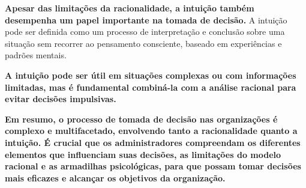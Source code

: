 \textbf{Apesar das limitações da racionalidade, a intuição também desempenha um papel importante na tomada de decisão.} A intuição pode ser definida como um processo de interpretação e conclusão sobre uma situação sem recorrer ao pensamento consciente, baseado em experiências e padrões mentais.

\textbf{A intuição pode ser útil em situações complexas ou com informações limitadas, mas é fundamental combiná-la com a análise racional para evitar decisões impulsivas.}

\textbf{Em resumo, o processo de tomada de decisão nas organizações é complexo e multifacetado, envolvendo tanto a racionalidade quanto a intuição. É crucial que os administradores compreendam os diferentes elementos que influenciam suas decisões, as limitações do modelo racional e as armadilhas psicológicas, para que possam tomar decisões mais eficazes e alcançar os objetivos da organização.}